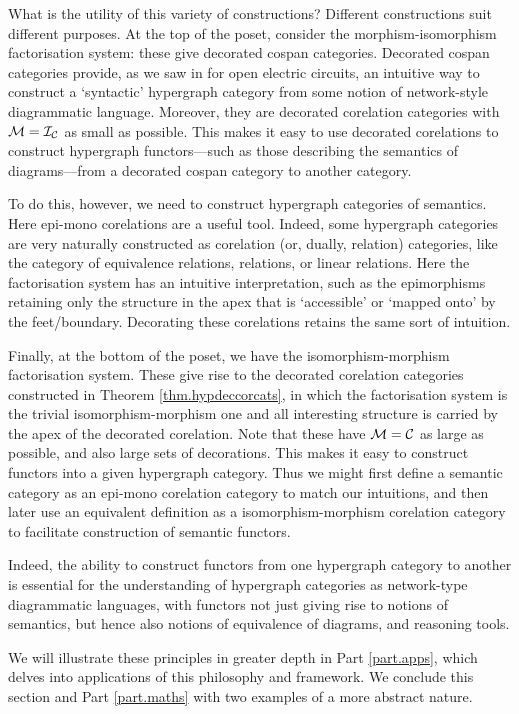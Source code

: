 What is the utility of this variety of constructions? Different constructions
suit different purposes. At the top of the poset, consider the
morphism-isomorphism factorisation system: these give decorated cospan
categories. Decorated cospan categories provide, as we saw in for open electric
circuits, an intuitive way to construct a `syntactic' hypergraph category from
some notion of network-style diagrammatic language. Moreover, they are decorated
corelation categories with $\mathcal M = \mathcal I_{\mathcal C}$ as small as possible. This
makes it easy to use decorated corelations to construct hypergraph
functors---such as those describing the semantics of diagrams---from a decorated
cospan category to another category.

To do this, however, we need to construct hypergraph categories of semantics.
Here epi-mono corelations are a useful tool. Indeed, some hypergraph categories
are very naturally constructed as corelation (or, dually, relation) categories,
like the category of equivalence relations, relations, or linear relations. Here
the factorisation system has an intuitive interpretation, such as the
epimorphisms retaining only the structure in the apex that is `accessible' or
`mapped onto' by the feet/boundary. Decorating these corelations retains the
same sort of intuition. 

Finally, at the bottom of the poset, we have the isomorphism-morphism
factorisation system. These give rise to the decorated corelation categories
constructed in Theorem \ref{thm.hypdeccorcats}, in which the factorisation
system is the trivial isomorphism-morphism one and all interesting structure is
carried by the apex of the decorated corelation. Note that these have $\mathcal M =
\mathcal C$ as large as possible, and also large sets of decorations. This makes it
easy to construct functors into a given hypergraph category. Thus we might first
define a semantic category as an epi-mono corelation category to match our
intuitions, and then later use an equivalent definition as a
isomorphism-morphism corelation category to facilitate construction of semantic
functors.

Indeed, the ability to construct functors from one hypergraph category to
another is essential for the understanding of hypergraph categories as
network-type diagrammatic languages, with functors not just giving rise to
notions of semantics, but hence also notions of equivalence of diagrams, and
reasoning tools.

We will illustrate these principles in greater depth in Part \ref{part.apps},
which delves into applications of this philosophy and framework. We conclude
this section and Part \ref{part.maths} with two examples of a more abstract
nature.

